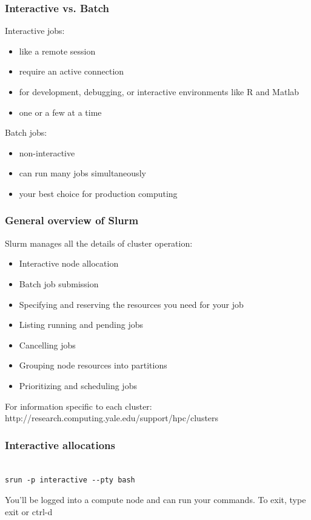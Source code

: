 \documentclass[10pt]{beamer}
\begin{document}
\begin{frame}[fragile]
\frametitle{Interactive vs. Batch}

Interactive jobs:
\begin{itemize}
\item like a remote session
\item require an active connection
\item for development, debugging, or 
interactive environments like R and Matlab
\item one or a few at a time 
\end{itemize}
\vskip10pt

Batch jobs:
\begin{itemize}
\item non-interactive  
\item can run many jobs simultaneously
\item your best choice for production computing
\end{itemize}
\end{frame}

\begin{frame}[fragile]
\frametitle{General overview of Slurm}

Slurm manages all the details of cluster operation:
\begin{itemize}
\item Interactive node allocation
\item Batch job submission
\item Specifying and reserving the resources you need for your job
\item Listing running and pending jobs
\item Cancelling jobs
\item Grouping node resources into partitions
\item Prioritizing and scheduling jobs
\end{itemize}

For information specific to each cluster:
http://research.computing.yale.edu/support/hpc/clusters

\end{frame}

\begin{frame}[fragile]
\frametitle{Interactive allocations}

\begin{verbatim}

srun -p interactive --pty bash

\end{verbatim}

You'll be logged into a compute node and can run your commands. 
\vspace{0.1in}
To exit, type exit or ctrl-d

\end{frame}
\end{document}
